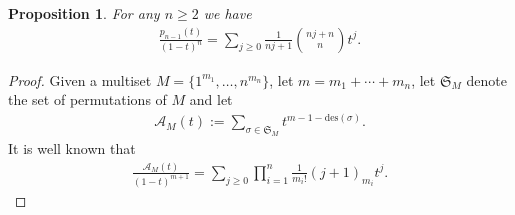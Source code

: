 \documentclass[12pt]{article}
\newtheorem{prop}[thm]{Proposition}
\newcommand{\des}{\mathrm{des}}
\newcommand{\PP}{p}
\numberwithin{equation}{section}
\begin{document}
\begin{prop}\label{thm-gf-parking}
For any $n\geq 2$ we have
\begin{align*}
\frac{\PP_{n-1}(t)}{{(1-t)^{n}}}=\sum_{j\geq 0}\frac{1}{nj+1}\binom{nj+n}{n}t^j.
\end{align*}
\end{prop}
\begin{proof} 
Given a multiset $M = \{1^{m_1},\dots,n^{m_n}\}$, let $m=m_1+\cdots+m_n$, let $\mathfrak{S}_M$ denote the set of permutations of $M$ and let
\begin{align}\label{eq-gf-multiset}
\mathcal{A}_M(t):=\sum_{\sigma\in \mathfrak{S}_M}t^{m-1-\des(\sigma)}.
\end{align}
It is well known that 
\begin{align}\label{MacMahon-generating}
    \frac{\mathcal{A}_M(t)}{(1-t)^{m+1}}=\sum_{j\geq 0}\prod_{i=1}^{n}\frac{1}{m_i!}\left(j+1\right)_{m_i}t^{j}.
\end{align}


\end{proof}
\end{document}
